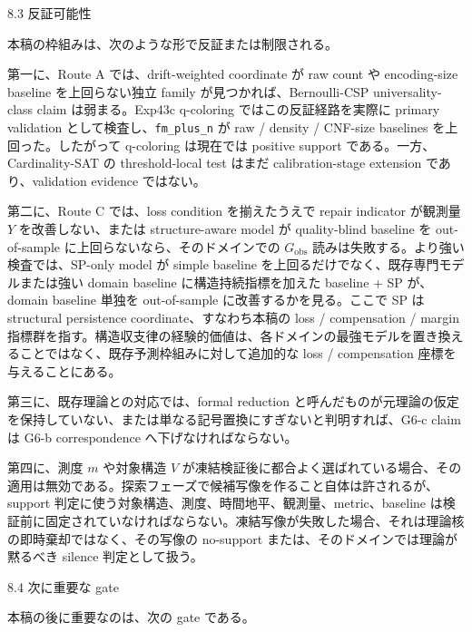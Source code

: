 \documentclass[12pt,a4paper]{article}
\begin{document}
8.3 反証可能性

本稿の枠組みは、次のような形で反証または制限される。

第一に、Route A では、drift-weighted coordinate が raw count や encoding-size baseline を上回らない独立 family が見つかれば、Bernoulli-CSP universality-class claim は弱まる。Exp43c q-coloring ではこの反証経路を実際に primary validation として検査し、\texttt{fm\_plus\_n} が raw / density / CNF-size baselines を上回った。したがって q-coloring は現在では positive support である。一方、Cardinality-SAT の threshold-local test はまだ calibration-stage extension であり、validation evidence ではない。

第二に、Route C では、loss condition を揃えたうえで repair indicator が観測量 \(Y\) を改善しない、または structure-aware model が quality-blind baseline を out-of-sample に上回らないなら、そのドメインでの \(G_{\mathrm{obs}}\) 読みは失敗する。より強い検査では、SP-only model が simple baseline を上回るだけでなく、既存専門モデルまたは強い domain baseline に構造持続指標を加えた baseline + SP が、domain baseline 単独を out-of-sample に改善するかを見る。ここで SP は structural persistence coordinate、すなわち本稿の loss / compensation / margin 指標群を指す。構造収支律の経験的価値は、各ドメインの最強モデルを置き換えることではなく、既存予測枠組みに対して追加的な loss / compensation 座標を与えることにある。

第三に、既存理論との対応では、formal reduction と呼んだものが元理論の仮定を保持していない、または単なる記号置換にすぎないと判明すれば、G6-c claim は G6-b correspondence へ下げなければならない。

第四に、測度 \(m\) や対象構造 \(V\) が凍結検証後に都合よく選ばれている場合、その適用は無効である。探索フェーズで候補写像を作ること自体は許されるが、support 判定に使う対象構造、測度、時間地平、観測量、metric、baseline は検証前に固定されていなければならない。凍結写像が失敗した場合、それは理論核の即時棄却ではなく、その写像の no-support または、そのドメインでは理論が黙るべき silence 判定として扱う。

8.4 次に重要な gate

本稿の後に重要なのは、次の gate である。
\end{document}
